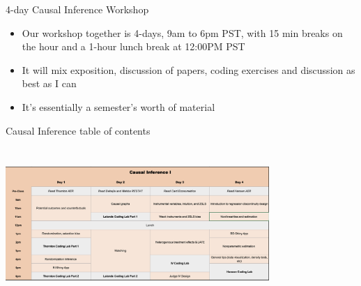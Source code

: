 \documentclass{beamer}
\begin{document}
\begin{frame}{4-day Causal Inference Workshop}

  \begin{itemize}
    \item Our workshop together is 4-days, 9am to 6pm PST, with 15 min breaks on the hour and a 1-hour lunch break at 12:00PM PST
    \item It will mix exposition, discussion of papers, coding exercises and discussion as best as I can
    \item It's essentially a semester's worth of material
  \end{itemize}

\end{frame}

\begin{frame}{Causal Inference table of contents}
  \centering
  \includegraphics[scale=0.5,height=6.5cm, width=10cm]{./lecture_includes/part1}
\end{frame}





%
\end{document}
